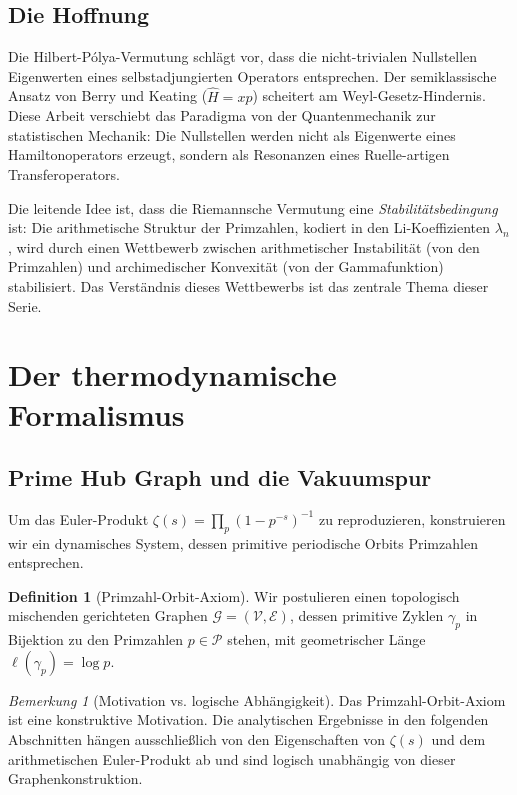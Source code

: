 \documentclass[12pt,a4paper]{article}
\theoremstyle{definition}
\newtheorem{definition}[theorem]{Definition}
\theoremstyle{remark}
\newtheorem{remark}[theorem]{Bemerkung}
\newcommand{\PP}{\mathcal{P}}
\begin{document}
\subsection{Die Hoffnung}

Die Hilbert-Pólya-Vermutung schlägt vor, dass die nicht-trivialen Nullstellen Eigenwerten eines selbstadjungierten Operators entsprechen. Der semiklassische Ansatz von Berry und Keating ($\hat{H} = xp$) scheitert am Weyl-Gesetz-Hindernis. Diese Arbeit verschiebt das Paradigma von der Quantenmechanik zur statistischen Mechanik: Die Nullstellen werden nicht als Eigenwerte eines Hamiltonoperators erzeugt, sondern als Resonanzen eines Ruelle-artigen Transferoperators.

Die leitende Idee ist, dass die Riemannsche Vermutung eine \emph{Stabilitätsbedingung} ist: Die arithmetische Struktur der Primzahlen, kodiert in den Li-Koeffizienten $\lambda_n$, wird durch einen Wettbewerb zwischen arithmetischer Instabilität (von den Primzahlen) und archimedischer Konvexität (von der Gammafunktion) stabilisiert. Das Verständnis dieses Wettbewerbs ist das zentrale Thema dieser Serie.


\section{Der thermodynamische Formalismus}
\label{sec:thermodynamic}

\subsection{Prime Hub Graph und die Vakuumspur}

Um das Euler-Produkt $\zeta(s) = \prod_p (1-p^{-s})^{-1}$ zu reproduzieren, konstruieren wir ein dynamisches System, dessen primitive periodische Orbits Primzahlen entsprechen.

\begin{definition}[Primzahl-Orbit-Axiom]
Wir postulieren einen topologisch mischenden gerichteten Graphen $\mathcal{G} = (\mathcal{V}, \mathcal{E})$, dessen primitive Zyklen $\gamma_p$ in Bijektion zu den Primzahlen $p \in \PP$ stehen, mit geometrischer Länge $\ell(\gamma_p) = \log p$.
\end{definition}

\begin{remark}[Motivation vs. logische Abhängigkeit]
Das Primzahl-Orbit-Axiom ist eine konstruktive Motivation. Die analytischen Ergebnisse in den folgenden Abschnitten hängen ausschließlich von den Eigenschaften von $\zeta(s)$ und dem arithmetischen Euler-Produkt ab und sind logisch unabhängig von dieser Graphenkonstruktion.
\end{remark}
\end{document}
